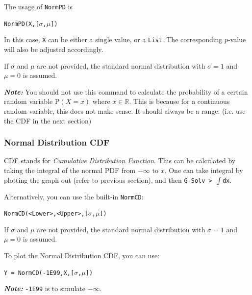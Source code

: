 \documentclass[a5paper]{memoir}
\def\code#1{\texttt{#1}}
\def\note#1{\textcolor[HTML]{109fa9}{\textbf{\textit{Note:}}} #1}
\newcommand{\addtoindex}[1]{#1\index{#1}}
\begin{document}
The usage of \code{\addtoindex{NormPD}} is 
\begin{center}
	\code{NormPD(X,[$\sigma$,$\mu$])}
\end{center}

In this case, \code{X} can be either a single value, or a \code{List}. The corresponding $p$-value will also be adjusted accordingly.

If $\sigma$ and $\mu$ are not provided, the standard normal distribution with $\sigma=1$ and $\mu=0$ is assumed.

\note{You should not use this command to calculate the probability of a certain random variable $\textrm{P}(X = x)$ where $x \in \mathbb{R}$. This is because for a continuous random variable, this does not make sense. It should always be a range. (i.e. use the CDF in the next section)}

\subsubsection{Normal Distribution CDF}
CDF stands for \textit{Cumulative Distribution Function}. This can be calculated by taking the integral of the normal PDF from $-\infty$ to $x$. One can take integral by plotting the graph out (refer to previous section), and then \code{G-Solv > $\int$dx}.

Alternatively, you can use the built-in \code{\addtoindex{NormCD}}:
\begin{center}
	\code{NormCD(<Lower>,<Upper>,[$\sigma$,$\mu$])}
\end{center}

If $\sigma$ and $\mu$ are not provided, the standard normal distribution with $\sigma=1$ and $\mu=0$ is assumed.

To plot the Normal Distribution CDF, you can use:
\begin{center}
	\code{Y = NormCD(-1E99,X,[$\sigma$,$\mu$])}
\end{center}

\note{\code{-1E99} is to simulate $-\infty$.}
\end{document}
